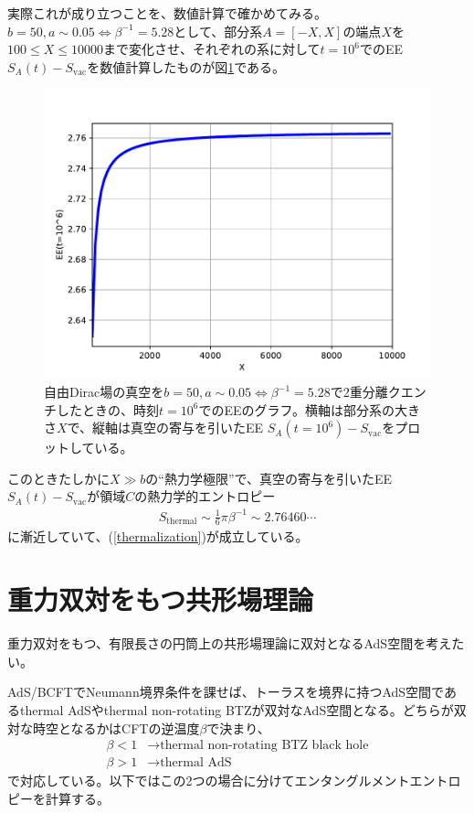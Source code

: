 実際これが成り立つことを、数値計算で確かめてみる。$b=50,a\sim 0.05\iff \beta^{-1}=5.28$として、部分系$A=[-X,X]$の端点$X$を$100\le X \le 10000$まで変化させ、それぞれの系に対して$t=10^6$でのEE $S_A(t)-S_\text{vac}$を数値計算したものが図\ref{fig:cthermalization}である。
\begin{figure}[H]
	\centering
	\includegraphics[width=0.7\linewidth]{Cthermalization.pdf}
	\caption{自由Dirac場の真空を$b=50,a\sim 0.05\iff \beta^{-1}=5.28$で2重分離クエンチしたときの、時刻$t=10^6$でのEEのグラフ。横軸は部分系の大きさ$X$で、縦軸は真空の寄与を引いたEE $S_A(t=10^6)-S_\text{vac}$をプロットしている。}
	\label{fig:cthermalization}
\end{figure}

このときたしかに$X\gg b$の``熱力学極限''で、真空の寄与を引いたEE　$S_A(t)-S_\text{vac}$が領域$C$の熱力学的エントロピー
\begin{align}
S_\text{thermal}\sim \frac{1}{6}\pi\beta^{-1}\sim 2.76460\cdots
\end{align}
に漸近していて、(\ref{thermalization})が成立している。
\pagebreak
\section{重力双対をもつ共形場理論}\label{sec:DSQholcft}
重力双対をもつ、有限長さの円筒上の共形場理論に双対となるAdS空間を考えたい。

AdS/BCFTでNeumann境界条件を課せば、トーラスを境界に持つAdS空間であるthermal AdSやthermal non-rotating BTZが双対なAdS空間となる。どちらが双対な時空となるかはCFTの逆温度$\beta$で決まり、
\begin{align}
\beta<1 &\to \text{thermal non-rotating BTZ black hole}\\
\beta>1 &\to \text{thermal AdS}
\end{align}
で対応している。以下ではこの2つの場合に分けてエンタングルメントエントロピーを計算する。

